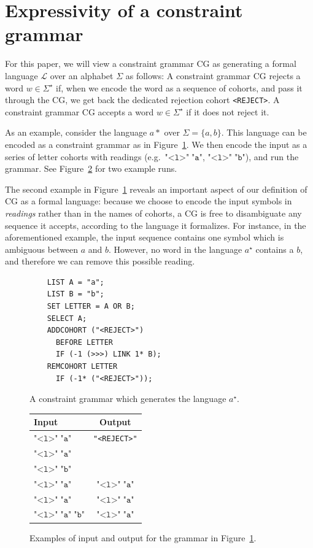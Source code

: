 \documentclass[11pt]{article}
\def\t#1{\texttt{#1}}
\begin{document}
\section{Expressivity of a constraint grammar}
For this paper, we will view a constraint grammar CG as generating a formal
language $\mathcal{L}$ over an alphabet $\Sigma$ as follows:
A constraint grammar CG rejects a word $w \in \Sigma^\star$ if, when we encode
the word as a sequence of cohorts, and pass it through the CG, we get back the
dedicated rejection cohort \texttt{<REJECT>}. A constraint grammar CG accepts a
word $w \in \Sigma^\star$ if it does not reject it. 

As an example, consider the language $a*$ over $\Sigma = \{a,b\}$. This language
can be encoded as a constraint grammar as in Figure~\ref{fig:astar}. We then
encode the input as a series of letter cohorts with readings (e.g.\
\(\t{"<l>"}\;\t{"a"}\), \(\t{"<l>"}\;\t{"b"}\)), and run the grammar. 
See Figure~\ref{fig:astario} for two example runs.

The second example in Figure~\ref{fig:astar} reveals an important aspect of our
definition of CG as a formal language: because we choose to encode the input
symbols in \emph{readings} rather than in the names of cohorts, a CG is free to
disambiguate any sequence it accepts, according to the language it formalizes.
For instance, in the aforementioned example, the input sequence contains one
symbol which is ambiguous between $a$ and $b$. However, no word in the language
$a^\star$ contains a $b$, and therefore we can remove this possible reading.
%
\begin{figure}[h]
  \begin{verbatim}
    LIST A = "a";
    LIST B = "b";
    SET LETTER = A OR B;
    SELECT A;
    ADDCOHORT ("<REJECT>")
      BEFORE LETTER 
      IF (-1 (>>>) LINK 1* B);
    REMCOHORT LETTER
      IF (-1* ("<REJECT>"));
  \end{verbatim}
  \caption{A constraint grammar which generates the language $a^\star$.}
  \label{fig:astar}
\end{figure}
%
\begin{figure}[h]
  \centering
  \begin{tabular}{l|c}
    \textbf{Input} & \textbf{Output} \\ \hline
    \(\t{"<l>"}\;\t{"a"}\)          & \t{"<REJECT>"} \\
    \(\t{"<l>"}\;\t{"a"}\)          \\
    \(\t{"<l>"}\;\t{"b"}\)          \\ \hline
    \(\t{"<l>"}\;\t{"a"}\)          & \(\t{"<l>"}\;\t{"a"}\) \\
    \(\t{"<l>"}\;\t{"a"}\)          & \(\t{"<l>"}\;\t{"a"}\) \\
    \(\t{"<l>"}\;\t{"a"}\;\t{"b"}\) & \(\t{"<l>"}\;\t{"a"}\)
  \end{tabular}
  \caption{Examples of input and output for the grammar in
    Figure~\ref{fig:astar}.}  
  \label{fig:astario}
\end{figure}
\end{document}
